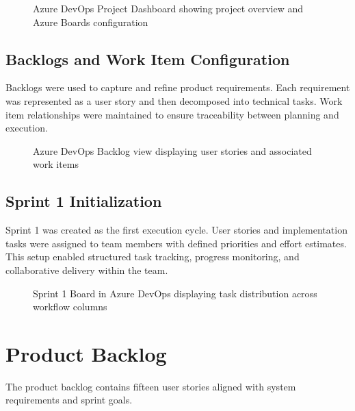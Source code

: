 \documentclass[12pt,a4paper]{article}
\begin{document}
\begin{figure}[H]
\centering
{}
\caption{Azure DevOps Project Dashboard showing project overview and Azure Boards configuration}
\end{figure}

\subsection{Backlogs and Work Item Configuration}

Backlogs were used to capture and refine product requirements. Each requirement was represented as a user story and then decomposed into technical tasks. Work item relationships were maintained to ensure traceability between planning and execution.

\begin{figure}[H]
\centering
{}
\caption{Azure DevOps Backlog view displaying user stories and associated work items}
\end{figure}

\subsection{Sprint 1 Initialization}

Sprint 1 was created as the first execution cycle. User stories and implementation tasks were assigned to team members with defined priorities and effort estimates. This setup enabled structured task tracking, progress monitoring, and collaborative delivery within the team.

\begin{figure}[H]
\centering
{}
\caption{Sprint 1 Board in Azure DevOps displaying task distribution across workflow columns}
\end{figure}

\section{Product Backlog}
The product backlog contains fifteen user stories aligned with system requirements and sprint goals.
\end{document}
